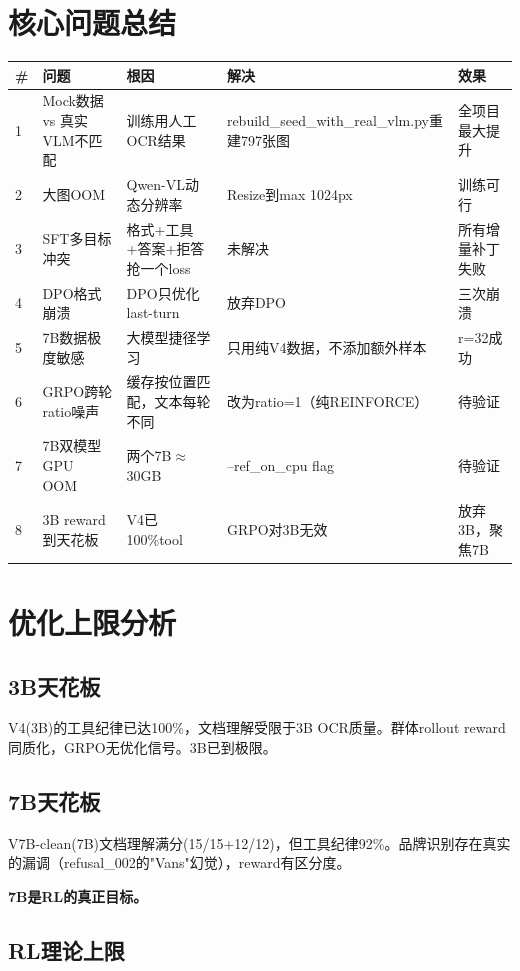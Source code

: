 \documentclass[fontset=none,11pt,a4paper]{ctexart}
\begin{document}
\section{核心问题总结}

\begin{longtable}{p{0.5cm}p{3.5cm}p{3.5cm}p{3cm}p{1.5cm}}
\toprule
\# & 问题 & 根因 & 解决 & 效果 \\
\midrule
1 & Mock数据 vs 真实VLM不匹配 & 训练用人工OCR结果 & rebuild\_seed\_with\_real\_vlm.py重建797张图 & 全项目最大提升 \\
2 & 大图OOM & Qwen-VL动态分辨率 & Resize到max 1024px & 训练可行 \\
3 & SFT多目标冲突 & 格式+工具+答案+拒答抢一个loss & 未解决 & 所有增量补丁失败 \\
4 & DPO格式崩溃 & DPO只优化last-turn & 放弃DPO & 三次崩溃 \\
5 & 7B数据极度敏感 & 大模型捷径学习 & 只用纯V4数据，不添加额外样本 & r=32成功 \\
6 & GRPO跨轮ratio噪声 & 缓存按位置匹配，文本每轮不同 & 改为ratio=1（纯REINFORCE） & 待验证 \\
7 & 7B双模型GPU OOM & 两个7B$\approx$30GB & --ref\_on\_cpu flag & 待验证 \\
8 & 3B reward到天花板 & V4已100\%tool & GRPO对3B无效 & 放弃3B，聚焦7B \\
\bottomrule
\end{longtable}

\section{优化上限分析}

\subsection{3B天花板}

V4(3B)的工具纪律已达100\%，文档理解受限于3B OCR质量。群体rollout reward同质化，GRPO无优化信号。3B已到极限。

\subsection{7B天花板}

V7B-clean(7B)文档理解满分(15/15+12/12)，但工具纪律92\%。品牌识别存在真实的漏调（refusal\_002的"Vans"幻觉），reward有区分度。

\textbf{7B是RL的真正目标。}

\subsection{RL理论上限}
\end{document}
